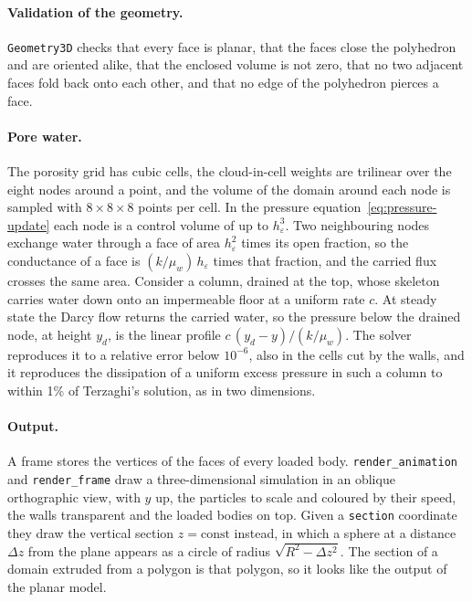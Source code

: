 \paragraph{Validation of the geometry.}
\texttt{Geometry3D} checks that every face is planar, that the faces close the polyhedron and are oriented alike, that the enclosed volume is not zero, that no two adjacent faces fold back onto each other, and that no edge of the polyhedron pierces a face.

\paragraph{Pore water.}
The porosity grid has cubic cells, the cloud-in-cell weights are trilinear over the eight nodes around a point, and the volume of the domain around each node is sampled with $8\times8\times8$ points per cell.
In the pressure equation~\eqref{eq:pressure-update} each node is a control volume of up to $h_{\varepsilon}^{3}$.
Two neighbouring nodes exchange water through a face of area $h_{\varepsilon}^{2}$ times its open fraction, so the conductance of a face is $(k/\mu_{w})\,h_{\varepsilon}$ times that fraction, and the carried flux crosses the same area.
Consider a column, drained at the top, whose skeleton carries water down onto an impermeable floor at a uniform rate $c$.
At steady state the Darcy flow returns the carried water, so the pressure below the drained node, at height $y_{d}$, is the linear profile $c\,(y_{d}-y)/(k/\mu_{w})$.
The solver reproduces it to a relative error below $10^{-6}$, also in the cells cut by the walls, and it reproduces the dissipation of a uniform excess pressure in such a column to within \num{1}\% of Terzaghi's solution, as in two dimensions.

\paragraph{Output.}
A frame stores the vertices of the faces of every loaded body.
\texttt{render\_animation} and \texttt{render\_frame} draw a three-dimensional simulation in an oblique orthographic view, with $y$ up, the particles to scale and coloured by their speed, the walls transparent and the loaded bodies on top.
Given a \texttt{section} coordinate they draw the vertical section $z=\text{const}$ instead, in which a sphere at a distance $\Delta z$ from the plane appears as a circle of radius $\sqrt{R^{2}-\Delta z^{2}}$.
The section of a domain extruded from a polygon is that polygon, so it looks like the output of the planar model.

